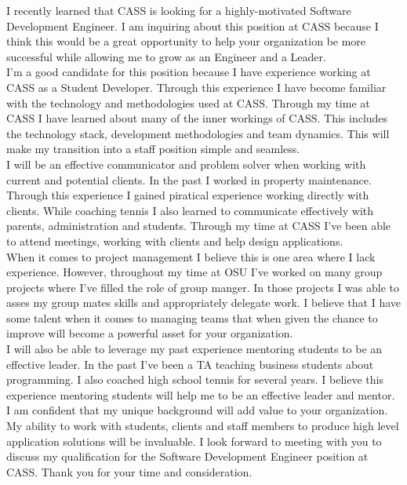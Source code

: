 \documentclass[11pt, a4paper]{awesome-cv}
\begin{document}
\makecvheader

\makelettertitle

\begin{cvletter}
    I recently learned that CASS is looking for a highly-motivated Software Development Engineer. I am inquiring about this position at CASS because I think this would be a great opportunity to help your organization be more successful while allowing me to grow as an Engineer and a Leader.\\
    
    I'm a good candidate for this position because I have experience working at CASS as a Student Developer. Through this experience I have become familiar with the technology and methodologies used at CASS. Through my time at CASS I have learned about many of the inner workings of CASS. This includes the technology stack, development methodologies and team dynamics. This will make my transition into a staff position simple and seamless.\\
    
    I will be an effective communicator and problem solver when working with current and potential clients. In the past I worked in property maintenance. Through this experience I gained piratical experience working directly with clients. While coaching tennis I also learned to communicate effectively with parents, administration and students. Through my time at CASS I've been able to attend meetings, working with clients and help design applications.\\
    
    When it comes to project management I believe this is one area where I lack experience. However, throughout my time at OSU I've worked on many group projects where I've filled the role of group manger. In those projects I was able to asses my group mates skills and appropriately delegate work. I believe that I have some talent when it comes to managing teams that when given the chance to improve will become a powerful asset for your organization.\\
    
    I will also be able to leverage my past experience mentoring students to be an effective leader. In the past I've been a TA teaching business students about programming. I also coached high school tennis for several years. I believe this experience mentoring students will help me to be an effective leader and mentor.\\
    
    I am confident that my unique background will add value to your organization. My ability to work with students, clients and staff members to produce high level application solutions will be invaluable. I look forward to meeting with you to discuss my qualification for the Software Development Engineer position at CASS. Thank you for your time and consideration.\\

\end{cvletter}

\makeletterclosing
\end{document}
